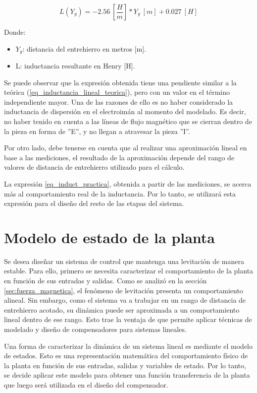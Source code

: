 \begin{equation}
	\label{eq_induct_practica}
	L(Y_g)=-2.56\:[\frac{H}{m}]*Y_{g}\:[m]+0.027\:[H]
\end{equation}

\noindent Donde:
\begin{itemize}
	\item $Y_{g}$: distancia del entrehierro en metros [m].
	\item L: inductancia resultante en Henry [H].
\end{itemize}

Se puede observar que la expresión obtenida tiene una pendiente similar a la teórica (\ref{eq_inductancia_lineal_teorica}), pero con un valor en el término independiente mayor. Una de las razones de ello es no haber considerado la inductancia de dispersión en el electroimán al momento del modelado. Es decir, no haber tenido en cuenta a las líneas de flujo magnético que se cierran dentro de la pieza en forma de ”E”, y no llegan a atravesar la pieza ”I”.  

Por otro lado, debe tenerse en cuenta que al realizar una aproximación lineal en base a las mediciones, el resultado de la aproximación depende del rango de valores de distancia de entrehierro utilizado para el cálculo. 

La expresión \ref{eq_induct_practica}, obtenida a partir de las mediciones, se acerca más al comportamiento real de la inductancia. Por lo tanto, se utilizará esta expresión para el diseño del resto de las etapas del sistema. 


\section{Modelo de estado de la planta} \label{sec_modelo_estados}

Se desea diseñar un sistema de control que mantenga una levitación de manera estable. Para ello, primero se necesita caracterizar el comportamiento de la planta en función de sus entradas y salidas. Como se analizó en la sección \ref{sec:fuerza_magnetica}, el fenómeno de levitación presenta un comportamiento alineal. Sin embargo, como el sistema va a trabajar en un rango de distancia de entrehierro acotado, su dinámica puede ser aproximada a un comportamiento lineal dentro de ese rango. Esto trae la ventaja de que permite aplicar técnicas de modelado y diseño de compensadores para sistemas lineales.

Una forma de caracterizar la dinámica de un sistema lineal es mediante el modelo de estados. Esto es una representación matemática del comportamiento físico de la planta en función de sus entradas, salidas y variables de estado. Por lo tanto, se decide aplicar este modelo para obtener una función transferencia de la planta que luego será utilizada en el diseño del compensador.

